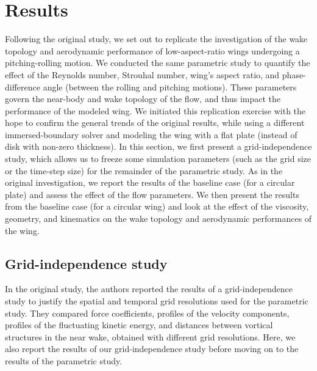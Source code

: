 \section{Results}

Following the original study, we set out to replicate the investigation of the wake topology and aerodynamic performance of low-aspect-ratio wings undergoing a pitching-rolling motion.
We conducted the same parametric study to quantify the effect of the Reynolds number, Strouhal number, wing's aspect ratio, and phase-difference angle (between the rolling and pitching motions).
These parameters govern the near-body and wake topology of the flow, and thus impact the performance of the modeled wing.
We initiated this replication exercise with the hope to confirm the general trends of the original results, while using a different immersed-boundary solver and modeling the wing with a flat plate (instead of disk with non-zero thickness).
In this section, we first present a grid-independence study, which allows us to freeze some simulation parameters (such as the grid size or the time-step size) for the remainder of the parametric study.
As in the original investigation, we report the results of the baseline case (for a circular plate) and assess the effect of the flow parameters.
We then present the results from the baseline case (for a circular wing) and look at the effect of the viscosity, geometry, and kinematics on the wake topology and aerodynamic performances of the wing.

\subsection{Grid-independence study}

In the original study, the authors reported the results of a grid-independence study to justify the spatial and temporal grid resolutions used for the parametric study.
They compared force coefficients, profiles of the velocity components, profiles of the fluctuating kinetic energy, and distances between vortical structures in the near wake, obtained with different grid resolutions.
Here, we also report the results of our grid-independence study before moving on to the results of the parametric study.


